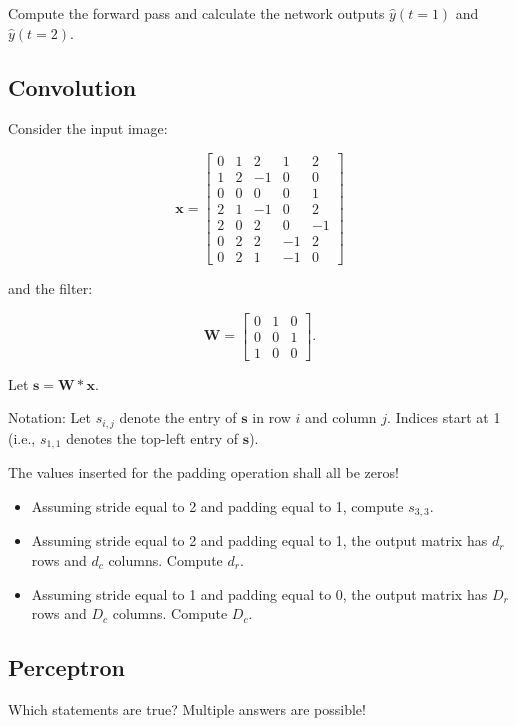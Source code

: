\documentclass{article}
\begin{document}
Compute the forward pass and calculate the network outputs \( \hat{y}(t=1) \) and \( \hat{y}(t=2) \).

\subsection*{Convolution}
Consider the input image:

\[
\mathbf{x} =
\begin{bmatrix}
0 & 1 & 2 & 1 & 2 \\
1 & 2 & -1 & 0 & 0 \\
0 & 0 & 0 & 0 & 1 \\
2 & 1 & -1 & 0 & 2 \\
2 & 0 & 2 & 0 & -1 \\
0 & 2 & 2 & -1 & 2 \\
0 & 2 & 1 & -1 & 0
\end{bmatrix}
\]

and the filter:

\[
\mathbf{W} =
\begin{bmatrix}
0 & 1 & 0 \\
0 & 0 & 1 \\
1 & 0 & 0
\end{bmatrix}.
\]

Let \(\mathbf{s} = \mathbf{W} \ast \mathbf{x}\).

Notation: Let \(s_{i,j}\) denote the entry of \(\mathbf{s}\) in row \(i\) and column \(j\). Indices start at 1 (i.e., \(s_{1,1}\) denotes the top-left entry of \(\mathbf{s}\)).

The values inserted for the padding operation shall all be zeros!

\begin{itemize}
    \item Assuming stride equal to 2 and padding equal to 1, compute \(s_{3,3}\).
    \item Assuming stride equal to 2 and padding equal to 1, the output matrix has \(d_r\) rows and \(d_c\) columns. Compute \(d_r\).
    \item Assuming stride equal to 1 and padding equal to 0, the output matrix has \(D_r\) rows and \(D_c\) columns. Compute \(D_c\).
\end{itemize}

\subsection*{Perceptron}

Which statements are true? Multiple answers are possible!
\end{document}

